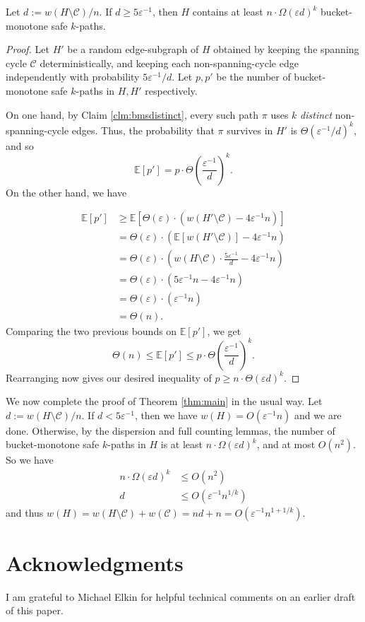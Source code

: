 \documentclass{article}\usepackage[a4paper,margin=20mm]{geometry}
\newcommand{\eps}{\varepsilon}
\newcommand{\cee}{\mathcal{C}}
\begin{document}
\begin{lemma} 
Let $d := w(H \setminus \cee) / n$.
If $d \ge 5 \eps^{-1}$, then $H$ contains at least $n \cdot \Omega(\eps d)^{k}$ bucket-monotone safe $k$-paths.
\end{lemma}
\begin{proof}
Let $H'$ be a random edge-subgraph of $H$ obtained by keeping the spanning cycle $\cee$ deterministically, and keeping each non-spanning-cycle edge independently with probability $5\eps^{-1} / d$.
Let $p, p'$ be the number of bucket-monotone safe $k$-paths in $H, H'$ respectively.

On one hand, by Claim \ref{clm:bmsdistinct}, every such path $\pi$ uses $k$ \emph{distinct} non-spanning-cycle edges.
Thus, the probability that $\pi$ survives in $H'$ is $\Theta(\eps^{-1} / d)^{k}$, and so
$$\mathbb{E}[p'] = p \cdot \Theta\left( \frac{\eps^{-1}}{d} \right)^{k}.$$
On the other hand, we have

\begin{align*}
\mathbb{E}[p'] &\ge \mathbb{E}\left[\Theta(\eps) \cdot \left( w(H' \setminus \cee) - 4\eps^{-1} n \right)\right] \tag*{Medium Counting Lemma}\\
&= \Theta(\eps) \cdot \left(\mathbb{E}\left[ w(H' \setminus \cee)\right] - 4\eps^{-1} n\right)\\
&= \Theta(\eps) \cdot \left( w(H \setminus \cee) \cdot \frac{5 \eps^{-1}}{d} - 4\eps^{-1}n\right)\\
&= \Theta(\eps) \cdot \left( 5 \eps^{-1} n - 4\eps^{-1} n\right)\\
&= \Theta(\eps) \cdot \left( \eps^{-1} n\right)\\
&= \Theta(n).
\end{align*}
Comparing the two previous bounds on $\mathbb{E}[p']$, we get
$$\Theta(n) \le \mathbb{E}[p'] \le p \cdot \Theta\left(\frac{\eps^{-1}}{d}\right)^{k}.$$
Rearranging now gives our desired inequality of
$p \ge n \cdot \Theta\left( \eps d \right)^k$.
\end{proof}

We now complete the proof of Theorem \ref{thm:main} in the usual way.
Let $d := w(H \setminus \cee)/n$.
If $d < 5 \eps^{-1}$, then we have $w(H) = O(\eps^{-1} n)$ and we are done.
Otherwise, by the dispersion and full counting lemmas, the number of bucket-monotone safe $k$-paths in $H$ is at least $n \cdot \Omega(\eps d)^k$, and at most $O(n^2)$.
So we have
\begin{align*}
n \cdot \Omega(\eps d)^k &\le O(n^2)\\
d &\le O\left(\eps^{-1} n^{1/k}\right)
\end{align*}
and thus $w(H) = w(H \setminus \cee) + w(\cee) = nd + n = O\left(\eps^{-1} n^{1+1/k}\right)$.

\section*{Acknowledgments}

I am grateful to Michael Elkin for helpful technical comments on an earlier draft of this paper.




\end{document}
